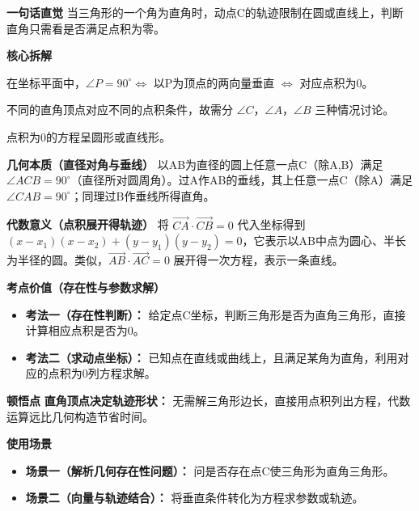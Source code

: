 \begin{explanationbox}
	\textbf{\textcolor{CExplanation}{一句话直觉}}
	当三角形的一个角为直角时，动点C的轨迹限制在圆或直线上，判断直角只需看是否满足点积为零。

	\medskip
	\textbf{\textcolor{CExplanation}{核心拆解}}
	\begin{description}[style=nextline, leftmargin=2.8em, labelsep=0.5em, itemsep=0.45em]
		\item[\textbf{要点一（垂直条件等价）：}]
			在坐标平面中，$\angle P=90^\circ \Leftrightarrow$ 以P为顶点的两向量垂直 $\Leftrightarrow$ 对应点积为0。
		\item[\textbf{要点二（分类讨论顶点）：}]
			不同的直角顶点对应不同的点积条件，故需分 $\angle C$，$\angle A$，$\angle B$ 三种情况讨论。
		\item[\textbf{要点三（轨迹本质）：}]
			点积为0的方程呈圆形或直线形。
	\end{description}

	\medskip
	\textbf{\textcolor{CExplanation}{几何本质（直径对角与垂线）}}
	以AB为直径的圆上任意一点C（除A,B）满足 $\angle ACB=90^\circ$（直径所对圆周角）。过A作AB的垂线，其上任意一点C（除A）满足 $\angle CAB=90^\circ$；同理过B作垂线所得直角。

	\medskip
	\textbf{\textcolor{CExplanation}{代数意义（点积展开得轨迹）}}
	将 $\overrightarrow{CA}\cdot\overrightarrow{CB}=0$ 代入坐标得到 $(x-x_1)(x-x_2)+(y-y_1)(y-y_2)=0$，它表示以AB中点为圆心、半长为半径的圆。类似，$\overrightarrow{AB}\cdot\overrightarrow{AC}=0$ 展开得一次方程，表示一条直线。

	\medskip
	\textbf{\textcolor{CExplanation}{考点价值（存在性与参数求解）}}
	\begin{itemize}[leftmargin=*, itemsep=0.5em, topsep=0.4em]
		\item \textbf{考法一（存在性判断）：} 给定点C坐标，判断三角形是否为直角三角形，直接计算相应点积是否为0。
		\item \textbf{考法二（求动点坐标）：} 已知点在直线或曲线上，且满足某角为直角，利用对应的点积为0列方程求解。
	\end{itemize}

	\medskip
	\textbf{\textcolor{CExplanation}{顿悟点}}
	\textbf{直角顶点决定轨迹形状：} 无需解三角形边长，直接用点积列出方程，代数运算远比几何构造节省时间。

	\medskip
	\textbf{\textcolor{CExplanation}{使用场景}}
	\begin{itemize}[leftmargin=*, itemsep=0.5em, topsep=0.4em]
		\item \textbf{场景一（解析几何存在性问题）：} 问是否存在点C使三角形为直角三角形。
		\item \textbf{场景二（向量与轨迹结合）：} 将垂直条件转化为方程求参数或轨迹。
	\end{itemize}

\end{explanationbox}
